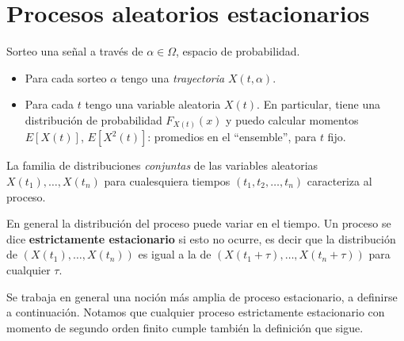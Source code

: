 \section{Procesos aleatorios estacionarios}\label{sec.estoc}

Sorteo una señal a través de $\alpha\in\Omega$, espacio de probabilidad.
\begin{itemize}
    \item Para cada sorteo $\alpha$ tengo una {\em trayectoria}
    $X(t,\alpha)$.
    \item Para cada $t$ tengo una variable aleatoria $X(t)$. En particular, tiene una distribución de probabilidad $F_{X(t)}(x)$ y puedo calcular
    momentos $E\left[X(t)\right]$, $E\left[X^2(t)\right]$: promedios en el ``ensemble'', para $t$ fijo.
\end{itemize}

\begin{figure}[h]
    \centering
\end{figure}

La familia de distribuciones \emph{conjuntas} de las variables
aleatorias $X(t_1),\ldots,X(t_n)$ para cualesquiera tiempos
$(t_1,t_2,\ldots,t_n)$ caracteriza al proceso.

En general la distribución del proceso puede variar en el
tiempo. Un proceso se dice {\bf estrictamente estacionario} si
esto no ocurre, es decir que la distribución de
$\left(X(t_1),\ldots,X(t_n)\right)$ es igual a la de
$\left(X(t_1+\tau),\ldots,X(t_n+\tau)\right)$ para cualquier
$\tau$.

Se trabaja en general una noción más amplia de proceso
estacionario, a definirse a continuación. Notamos que cualquier
proceso estrictamente estacionario con momento de segundo orden
finito cumple también la definición que sigue.

